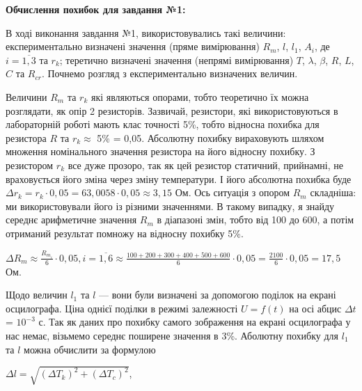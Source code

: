 \documentclass[12pt,a4paper]{article}
\begin{document}
    \vspace{1em} %

    \textbf{\large Обчислення похибок для завдання №1:}

    \vspace{1em} %
    \setlength{\parindent}{1.5em}

    В ході виконання завдання №1, використовувались такі величини: експериментально визначені значення (пряме вимірювання) $R_m$, $l$, $l_1$, $A_i$, де $i = \overline{1, 3}$ та $r_k$;
    теретично визначені значення (непрямі вимірювання) $T$, $\lambda$, $\beta$, $R$, $L$, $C$ та $R_{cr}$. Почнемо розгляд з експериментально визначених величин.

    Величини $R_m$ та $r_k$ які являються опорами, тобто теоретично їх можна розглядати, як опір 2 резисторів. Зазвичай, резистори,
    які використовуються в лабораторній роботі мають клас точності 5\%, тобто відносна похибка для резистора $R$ та $r_k \approx$ 5\% = 0,05. Абсолютну похибку
    вираховують шляхом множення номінального значення резистора на його відносну похибку. З резистором $r_k$ все дуже прозоро, так як цей резистор статичний, прийнамні, не враховується його зміна через зміну температури.
    І його абсолютна похибка буде $\Delta r_k = r_k \cdot 0,05 = 63,0058 \cdot 0,05 \approx 3,15$ Ом. Ось ситуація з опором $R_m$ складніша: ми використовували його із різними значеннями.
    В такому випадку, я знайду середнє арифметичне значення $R_m$ в діапазоні змін, тобто від 100 до 600, а потім отриманий результат помножу на відносну похибку 5\%.

    \vspace{1em} %
    \setlength{\parindent}{0pt}

    $\displaystyle \Delta R_m \approx \frac{R_{m_i}}{6} \cdot 0,05, i = \overline{1, 6} \approx \frac{100 + 200 + 300 + 400 + 500 + 600}{6} \cdot 0,05 = \frac{2100}{6} \cdot 0,05 = 17,5$ Ом.

    \setlength{\parindent}{1.5em}

    Щодо величин $l_1$ та $l$ --- вони були визначені за допомогою поділок на екрані осцилографа. Ціна однієї поділки в режимі залежності $U = f(t)$ на осі абцис $\Delta t$ = $10^{-3}$ с. Так як даних про похибку
    самого зображення на екрані осцилографа у нас немає, візьмемо середнє поширене значення в 3\%. Аболютну похибку для $l_1$ та $l$ можна обчислити за формулою

    \begin{center}
        $\displaystyle \Delta l = \sqrt{(\Delta T_k)^2 + (\Delta T_c)^2}$,
    \end{center}
\end{document}
